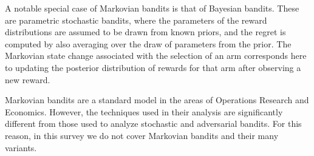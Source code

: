 A notable special case of Markovian bandits is that of Bayesian bandits. These are parametric stochastic bandits, where the parameters of the reward distributions are assumed to be drawn from known priors, and the regret is computed by also averaging over the draw of parameters from the prior. The Markovian state change associated with the selection of an arm corresponds here to updating the posterior distribution of rewards for that arm after observing a new reward.

Markovian bandits are a standard model in the areas of Operations Research and Economics. However, the techniques used in their analysis are significantly different from those used to analyze stochastic and adversarial bandits. For this reason, in this survey we do not cover Markovian bandits and their many variants.
